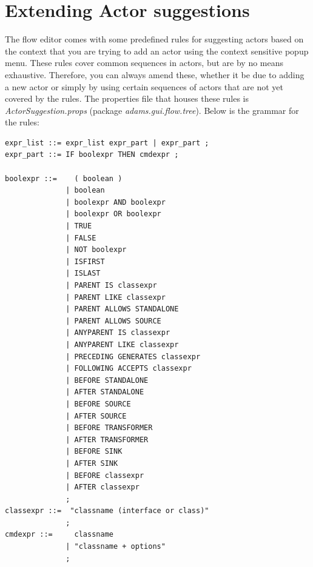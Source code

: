 \section{Extending Actor suggestions}
The flow editor comes with some predefined rules for suggesting actors based
on the context that you are trying to add an actor using the context sensitive
popup menu. These rules cover common sequences in actors, but are by no means
exhaustive. Therefore, you can always amend these, whether it be due to adding
a new actor or simply by using certain sequences of actors that are not yet
covered by the rules. The properties file that houses these rules is
\textit{ActorSuggestion.props} (package \textit{adams.gui.flow.tree}).
Below is the grammar for the rules:
{\small \begin{verbatim}
expr_list ::= expr_list expr_part | expr_part ;
expr_part ::= IF boolexpr THEN cmdexpr ;

boolexpr ::=    ( boolean )
              | boolean
              | boolexpr AND boolexpr
              | boolexpr OR boolexpr
              | TRUE
              | FALSE
              | NOT boolexpr
              | ISFIRST
              | ISLAST
              | PARENT IS classexpr
              | PARENT LIKE classexpr
              | PARENT ALLOWS STANDALONE
              | PARENT ALLOWS SOURCE
              | ANYPARENT IS classexpr
              | ANYPARENT LIKE classexpr
              | PRECEDING GENERATES classexpr
              | FOLLOWING ACCEPTS classexpr
              | BEFORE STANDALONE
              | AFTER STANDALONE
              | BEFORE SOURCE
              | AFTER SOURCE
              | BEFORE TRANSFORMER
              | AFTER TRANSFORMER
              | BEFORE SINK
              | AFTER SINK
              | BEFORE classexpr
              | AFTER classexpr
              ;
classexpr ::=  "classname (interface or class)"
              ;
cmdexpr ::=     classname
              | "classname + options"
              ;
\end{verbatim}}

